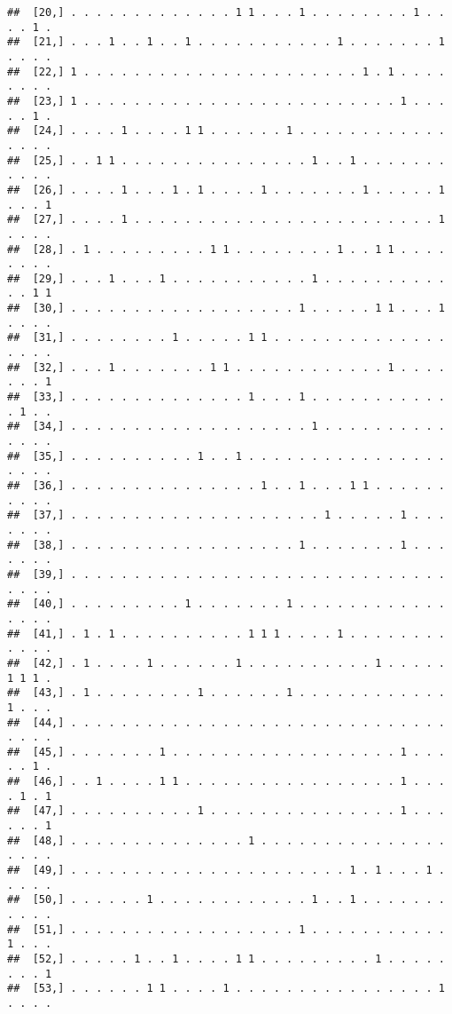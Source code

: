 \documentclass{article}\usepackage[]{graphicx}\usepackage[]{color}
\makeatletter
\newenvironment{kframe}{%
 \def\at@end@of@kframe{}%
 \ifinner\ifhmode%
  \def\at@end@of@kframe{\end{minipage}}%
  \begin{minipage}{\columnwidth}%
 \fi\fi%
 \def\FrameCommand##1{\hskip\@totalleftmargin \hskip-\fboxsep
 \colorbox{shadecolor}{##1}\hskip-\fboxsep
     \hskip-\linewidth \hskip-\@totalleftmargin \hskip\columnwidth}%
 \MakeFramed {\advance\hsize-\width
   \@totalleftmargin\z@ \linewidth\hsize
   \@setminipage}}%
 {\par\unskip\endMakeFramed%
 \at@end@of@kframe}
\newenvironment{knitrout}{}{} %
\makeatother
\begin{document}
\begin{knitrout}
\begin{kframe}
\begin{verbatim}
##  [20,] . . . . . . . . . . . . . 1 1 . . . 1 . . . . . . . . 1 . . . . 1 .
##  [21,] . . . 1 . . 1 . . 1 . . . . . . . . . . . 1 . . . . . . . 1 . . . .
##  [22,] 1 . . . . . . . . . . . . . . . . . . . . . . 1 . 1 . . . . . . . .
##  [23,] 1 . . . . . . . . . . . . . . . . . . . . . . . . . 1 . . . . . 1 .
##  [24,] . . . . 1 . . . . 1 1 . . . . . . 1 . . . . . . . . . . . . . . . .
##  [25,] . . 1 1 . . . . . . . . . . . . . . . 1 . . 1 . . . . . . . . . . .
##  [26,] . . . . 1 . . . 1 . 1 . . . . 1 . . . . . . . 1 . . . . . 1 . . . 1
##  [27,] . . . . 1 . . . . . . . . . . . . . . . . . . . . . . . . 1 . . . .
##  [28,] . 1 . . . . . . . . . 1 1 . . . . . . . . 1 . . 1 1 . . . . . . . .
##  [29,] . . . 1 . . . 1 . . . . . . . . . . . 1 . . . . . . . . . . . . 1 1
##  [30,] . . . . . . . . . . . . . . . . . . 1 . . . . . 1 1 . . . 1 . . . .
##  [31,] . . . . . . . . 1 . . . . . 1 1 . . . . . . . . . . . . . . . . . .
##  [32,] . . . 1 . . . . . . . 1 1 . . . . . . . . . . . . 1 . . . . . . . 1
##  [33,] . . . . . . . . . . . . . . 1 . . . 1 . . . . . . . . . . . . 1 . .
##  [34,] . . . . . . . . . . . . . . . . . . . 1 . . . . . . . . . . . . . .
##  [35,] . . . . . . . . . . 1 . . 1 . . . . . . . . . . . . . . . . . . . .
##  [36,] . . . . . . . . . . . . . . . 1 . . 1 . . . 1 1 . . . . . . . . . .
##  [37,] . . . . . . . . . . . . . . . . . . . . 1 . . . . . 1 . . . . . . .
##  [38,] . . . . . . . . . . . . . . . . . . 1 . . . . . . . 1 . . . . . . .
##  [39,] . . . . . . . . . . . . . . . . . . . . . . . . . . . . . . . . . .
##  [40,] . . . . . . . . . 1 . . . . . . . 1 . . . . . . . . . . . . . . . .
##  [41,] . 1 . 1 . . . . . . . . . . 1 1 1 . . . . 1 . . . . . . . . . . . .
##  [42,] . 1 . . . . 1 . . . . . . 1 . . . . . . . . . . 1 . . . . . 1 1 1 .
##  [43,] . 1 . . . . . . . . 1 . . . . . . 1 . . . . . . . . . . . . 1 . . .
##  [44,] . . . . . . . . . . . . . . . . . . . . . . . . . . . . . . . . . .
##  [45,] . . . . . . . 1 . . . . . . . . . . . . . . . . . . 1 . . . . . 1 .
##  [46,] . . 1 . . . . 1 1 . . . . . . . . . . . . . . . . . 1 . . . . 1 . 1
##  [47,] . . . . . . . . . . 1 . . . . . . . . . . . . . . . 1 . . . . . . 1
##  [48,] . . . . . . . . . . . . . . 1 . . . . . . . . . . . . . . . . . . .
##  [49,] . . . . . . . . . . . . . . . . . . . . . . 1 . 1 . . . 1 . . . . .
##  [50,] . . . . . . 1 . . . . . . . . . . . . 1 . . 1 . . . . . . . . . . .
##  [51,] . . . . . . . . . . . . . . . . . . 1 . . . . . . . . . . . 1 . . .
##  [52,] . . . . . 1 . . 1 . . . . 1 1 . . . . . . . . . 1 . . . . . . . . 1
##  [53,] . . . . . . 1 1 . . . . 1 . . . . . . . . . . . . . . . . 1 . . . .

\end{verbatim}
\end{kframe}
\end{knitrout}
\end{document}
